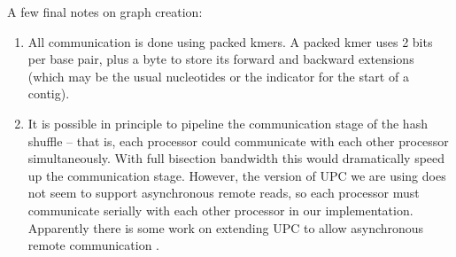 \documentclass{article}
\begin{document}
A few final notes on graph creation:
\begin{enumerate}
  \item All communication is done using packed kmers.  A packed kmer uses 2 bits per base pair, plus a byte to store its forward and backward extensions (which may be the usual nucleotides or the indicator for the start of a contig).
  \item It is possible in principle to pipeline the communication stage of the hash shuffle -- that is, each processor could communicate with each other processor simultaneously.  With full bisection bandwidth this would dramatically speed up the communication stage.  However, the version of UPC we are using does not seem to support asynchronous remote reads, so each processor must communicate serially with each other processor in our implementation.  Apparently there is some work on extending UPC to allow asynchronous remote communication \cite{shet2009asynchronous}.
\end{enumerate}

%
\end{document}
